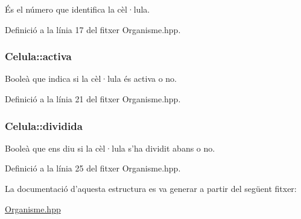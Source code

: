 És el número que identifica la cèl·lula. 



Definició a la línia 17 del fitxer Organisme.\-hpp.

\hypertarget{struct_celula_ad9c2e6f0c72719aa73b472bb44434098}{
\subsubsection[{activa}]{\setlength{\rightskip}{0pt plus 5cm}Celula\-::activa}}\label{struct_celula_ad9c2e6f0c72719aa73b472bb44434098}


Booleà que indica si la cèl·lula és activa o no. 



Definició a la línia 21 del fitxer Organisme.\-hpp.

\hypertarget{struct_celula_ada607a6566845c6511d8fd827d33e8d4}{
\subsubsection[{dividida}]{\setlength{\rightskip}{0pt plus 5cm}Celula\-::dividida}}\label{struct_celula_ada607a6566845c6511d8fd827d33e8d4}


Booleà que ens diu si la cèl·lula s'ha dividit abans o no. 



Definició a la línia 25 del fitxer Organisme.\-hpp.



La documentació d'aquesta estructura es va generar a partir del següent fitxer\-:\begin{DoxyCompactItemize}
\item 
\hyperlink{_organisme_8hpp}{Organisme.\-hpp}\end{DoxyCompactItemize}
